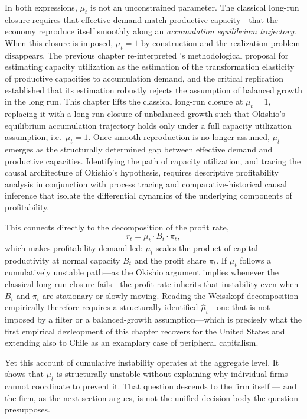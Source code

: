 \documentclass[11pt,a4paper]{article}
\begin{document}
In both expressions, $\mu_t$ is not an unconstrained parameter. The classical long-run closure requires that effective demand match productive capacity---that the economy reproduce itself smoothly along an \emph{accumulation equilibrium trajectory}. When this closure is imposed, $\mu_t = 1$ by construction and the realization problem disappears. The previous chapter re-interpreted \citet{Shaikh2016}'s methodological proposal for estimating capacity utilization as the estimation of the transformation elasticity of productive capacities to accumulation demand, and the critical replication established that its estimation robustly rejects the assumption of balanced growth in the long run. This chapter lifts the classical long-run closure at $\mu_t=1$, replacing it with a long-run closure of unbalanced growth such that Okishio's equilibrium accumulation trajectory holds only under a full capacity utilization assumption, i.e.\ $\mu_t = 1$. Once smooth reproduction is no longer assumed, $\mu_t$ emerges as the structurally determined gap between effective demand and productive capacities. Identifying the path of capacity utilization, and tracing the causal architecture of Okishio's hypothesis, requires descriptive profitability analysis in conjunction with process tracing and comparative-historical causal inference that isolate the differential dynamics of the underlying components of profitability.

This connects directly to the \citet{Weisskopf1979} decomposition of the profit rate,
\begin{equation}
	r_t = \mu_t \cdot B_t \cdot \pi_t, \label{eq:weisskopf_preview}
\end{equation}
which makes profitability demand-led: $\mu_t$ scales the product of capital productivity at normal capacity $B_t$ and the profit share $\pi_t$. If $\mu_t$ follows a cumulatively unstable path---as the Okishio argument implies whenever the classical long-run closure fails---the profit rate inherits that instability even when $B_t$ and $\pi_t$ are stationary or slowly moving. Reading the Weisskopf decomposition empirically therefore requires a structurally identified $\hat{\mu}_t$---one that is not imposed by a filter or a balanced-growth assumption---which is precisely what the first empirical devleopment of this chapter recovers for the United States and extending also to Chile as an examplary case of peripheral capitalism.

Yet this account of cumulative instability operates at the aggregate level. It shows that $\mu_t$ is structurally unstable without explaining why individual firms cannot coordinate to prevent it. That question descends to the firm itself --- and the firm, as the next section argues, is not the unified decision-body the question presupposes. 
\end{document}
